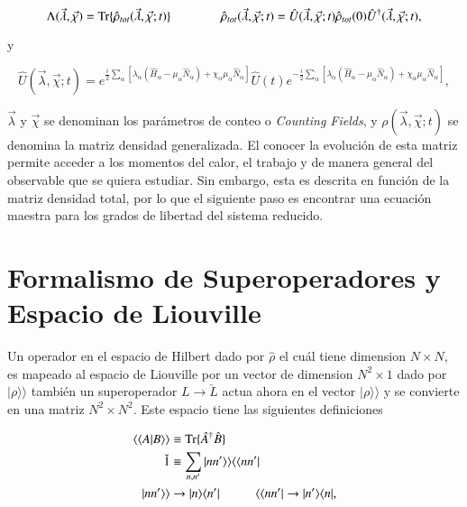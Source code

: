 \begin{equation}
    \Lambda(\vec{\lambda},\vec{\chi}) = \text{Tr}\{\hat{\rho}_{tot}(\vec{\lambda},\vec{\chi};t) \}    \hspace{14mm} \hat{\rho}_{tot}(\vec{\lambda},\vec{\chi};t) = \hat{U}(\vec{\lambda},\vec{\chi};t) \hat{\rho}_{tot}(0) \hat{U}^{\dagger}(\vec{\lambda},\vec{\chi};t),
    \label{sec2:evolucionconteo}
\end{equation}

y 

\begin{equation*}
    \hat{U}(\vec{\lambda},\vec{\chi};t) = e^{\frac{i}{2}\sum_{\alpha}[\lambda_{\alpha}(\hat{H}_{\alpha} - \mu_{\alpha}\hat{N}_{\alpha} ) + \chi_{\alpha}\mu_{\alpha}\hat{N}_{\alpha} ]  } \hat{U}(t) e^{-\frac{i}{2}\sum_{\alpha}[ \lambda_{\alpha}(\hat{H}_{\alpha} - \mu_{\alpha}\hat{N}_{\alpha}) + \chi_{\alpha}\mu_{\alpha}\hat{N}_{\alpha} ]},
\end{equation*}

$\vec{\lambda}$ y $\vec{\chi}$ se denominan los parámetros de conteo o \textit{Counting Fields}, y $\rho(\vec{\lambda},\vec{\chi};t)$ se denomina la matriz densidad generalizada. El conocer la evolución de esta matriz permite acceder a los momentos del calor, el trabajo y de manera general del observable que se quiera estudiar. Sin embargo, esta es descrita en función de la matriz densidad total, por lo que el siguiente paso es encontrar una ecuación maestra para los grados de libertad del sistema reducido.

\label{sec2:estadistica2puntos}



\section{Formalismo de Superoperadores y Espacio de Liouville}
Un operador en el espacio de Hilbert dado por $\hat{\rho}$ el cuál tiene dimension $N\times N$, es mapeado al espacio de Liouville por un vector de dimension $N^{2}\times 1$ dado por $|\rho \rangle \rangle$  también un superoperador $L \to \check{L}$ actua ahora en el vector $|\rho\rangle \rangle$ y se convierte en una matriz $N^{2}\times N^{2}$. Este espacio tiene las siguientes definiciones

\begin{align*}
    \langle \langle A|B\rangle \rangle  &\equiv \text{Tr}\{\hat{A}^{\dagger}\hat{B}\} \\
   \check{1}  &\equiv \sum_{n,n'}|nn'\rangle \rangle \langle \langle nn'| \\
     |nn'\rangle \rangle &  \to |n\rangle \langle n'|  \hspace{10mm}  \langle \langle nn'| \to |n'\rangle \langle n|,    
\end{align*}


